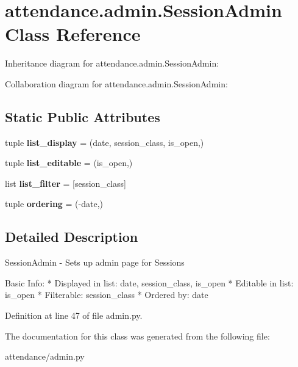 \hypertarget{classattendance_1_1admin_1_1_session_admin}{}\section{attendance.\+admin.\+Session\+Admin Class Reference}
\label{classattendance_1_1admin_1_1_session_admin}


Inheritance diagram for attendance.\+admin.\+Session\+Admin\+:


Collaboration diagram for attendance.\+admin.\+Session\+Admin\+:
\subsection*{Static Public Attributes}
\begin{DoxyCompactItemize}
\item 
\hypertarget{classattendance_1_1admin_1_1_session_admin_a30a8925e960ed5f02965029cd04da60c}{}\label{classattendance_1_1admin_1_1_session_admin_a30a8925e960ed5f02965029cd04da60c} 
tuple {\bfseries list\+\_\+display} = (\textquotesingle{}date\textquotesingle{}, \textquotesingle{}session\+\_\+class\textquotesingle{}, \textquotesingle{}is\+\_\+open\textquotesingle{},)
\item 
\hypertarget{classattendance_1_1admin_1_1_session_admin_a276746e472fae7ebd0893ae279990b2f}{}\label{classattendance_1_1admin_1_1_session_admin_a276746e472fae7ebd0893ae279990b2f} 
tuple {\bfseries list\+\_\+editable} = (\textquotesingle{}is\+\_\+open\textquotesingle{},)
\item 
\hypertarget{classattendance_1_1admin_1_1_session_admin_af65855968d383a07d57cc84df94bb59b}{}\label{classattendance_1_1admin_1_1_session_admin_af65855968d383a07d57cc84df94bb59b} 
list {\bfseries list\+\_\+filter} = \mbox{[}\textquotesingle{}session\+\_\+class\textquotesingle{}\mbox{]}
\item 
\hypertarget{classattendance_1_1admin_1_1_session_admin_adc2dd2c6559f622bfaf3dec14fbf0da7}{}\label{classattendance_1_1admin_1_1_session_admin_adc2dd2c6559f622bfaf3dec14fbf0da7} 
tuple {\bfseries ordering} = (\textquotesingle{}-\/date\textquotesingle{},)
\end{DoxyCompactItemize}


\subsection{Detailed Description}
\begin{DoxyVerb}SessionAdmin - Sets up admin page for Sessions

Basic Info:
* Displayed in list: date, session_class, is_open
* Editable in list: is_open
* Filterable: session_class
* Ordered by: date
\end{DoxyVerb}
 

Definition at line 47 of file admin.\+py.



The documentation for this class was generated from the following file\+:\begin{DoxyCompactItemize}
\item 
attendance/admin.\+py\end{DoxyCompactItemize}

